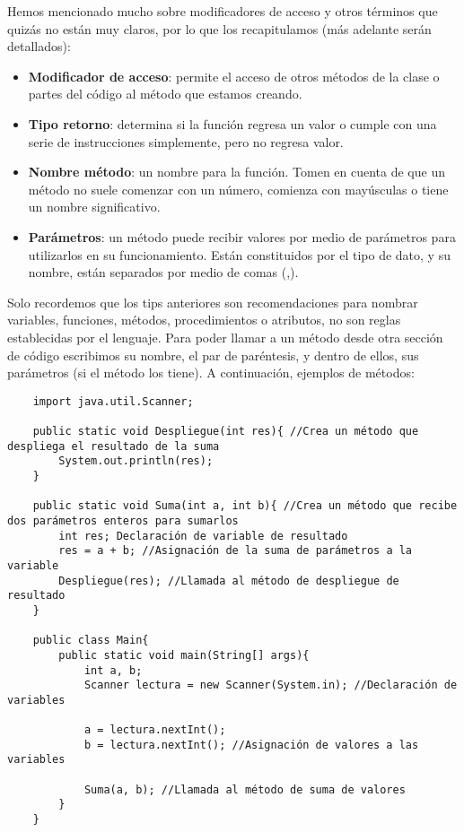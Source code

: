 Hemos mencionado mucho sobre modificadores de acceso y otros términos que quizás no están muy claros, por lo que los recapitulamos (más adelante serán detallados):
\begin{itemize}
    \item \textbf{Modificador de acceso}: permite el acceso de otros métodos de la clase o partes del código al método que estamos creando.
    \item \textbf{Tipo retorno}: determina si la función regresa un valor o cumple con una serie de instrucciones simplemente, pero no regresa valor.
    \item \textbf{Nombre método}: un nombre para la función. Tomen en cuenta de que un método no suele comenzar con un número, comienza con mayúsculas o tiene un nombre significativo.
    \item \textbf{Parámetros}: un método puede recibir valores por medio de parámetros para utilizarlos en su funcionamiento. Están constituidos por el tipo de dato, y su nombre, están separados por medio de comas (,).
\end{itemize}

Solo recordemos que los tips anteriores son recomendaciones para nombrar variables, funciones, métodos, procedimientos o atributos, no son reglas establecidas por el lenguaje. Para poder llamar a un método desde otra sección de código escribimos su nombre, el par de paréntesis, y dentro de ellos, sus parámetros (si el método los tiene). A continuación, ejemplos de métodos:
\begin{lstlisting}
    import java.util.Scanner;
    
    public static void Despliegue(int res){ //Crea un método que despliega el resultado de la suma
        System.out.println(res);
    }
    
    public static void Suma(int a, int b){ //Crea un método que recibe dos parámetros enteros para sumarlos
        int res; Declaración de variable de resultado
        res = a + b; //Asignación de la suma de parámetros a la variable
        Despliegue(res); //Llamada al método de despliegue de resultado
    }
    
    public class Main{
        public static void main(String[] args){
            int a, b;
            Scanner lectura = new Scanner(System.in); //Declaración de variables
            
            a = lectura.nextInt();
            b = lectura.nextInt(); //Asignación de valores a las variables
            
            Suma(a, b); //Llamada al método de suma de valores
        }
    }
\end{lstlisting}


